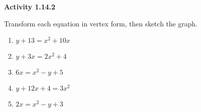\vspace{1ex}
\noindent\textbf{Activity 1.14.2}

\vspace{0.75ex}

Transform each equation in vertex form, then sketch the graph.
\begin{multicols}{2}
\begin{enumerate}[label = \color{blue}\arabic*. ]
\item $ y + 13 = x^{2} + 10x $
\item $ y + 3x  = 2x^{2} + 4 $ 
\item $ 6x = x^{2} - y + 5 $
\item $ y + 12x + 4 = 3x^{2} $
\item $ 2x = x^{2} - y + 3 $
\end{enumerate}
\end{multicols} 

